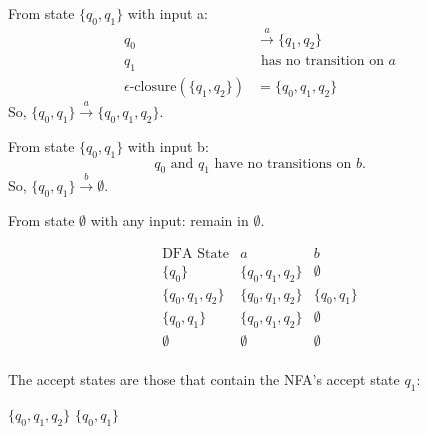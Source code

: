 \documentclass[12 pt]{article}
\begin{document}
   From state \( \{q_0, q_1\} \) with input a:
       \[
       \begin{aligned}
       q_0 &\xrightarrow{a} \{q_1, q_2\} \\
       q_1 &\text{ has no transition on } a \\
       \epsilon\text{-closure}(\{q_1, q_2\}) &= \{q_0, q_1, q_2\}
       \end{aligned}
       \]
       So, \( \{q_0, q_1\} \xrightarrow{a} \{q_0, q_1, q_2\} \).

     From state \( \{q_0, q_1\} \) with input b:
       \[
       q_0 \text{ and } q_1 \text{ have no transitions on } b.
       \]
       So, \( \{q_0, q_1\} \xrightarrow{b} \emptyset \).

   From state \( \emptyset \) with any input: remain in \( \emptyset \).

   \[
   \begin{array}{c|c|c}
   \text{DFA State} & a & b \\
   \hline
   \{q_0\} & \{q_0, q_1, q_2\} & \emptyset \\
   \{q_0, q_1, q_2\} & \{q_0, q_1, q_2\} & \{q_0, q_1\} \\
   \{q_0, q_1\} & \{q_0, q_1, q_2\} & \emptyset \\
   \emptyset & \emptyset & \emptyset \\
   \end{array}
   \]

   The accept states are those that contain the NFA's accept state \( q_1 \):

   \( \{q_0, q_1, q_2\} \)
   \( \{q_0, q_1\} \)


\begin{center}
\end{center}
\end{document}
